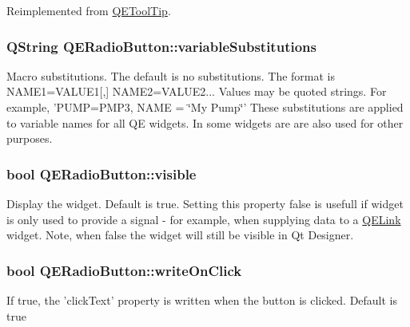 Reimplemented from \hyperlink{classQEToolTip}{QEToolTip}.

\hypertarget{classQERadioButton_ab2ed7b39ab32d1a5067d1c8e9fad850b}{
\subsubsection[{variableSubstitutions}]{\setlength{\rightskip}{0pt plus 5cm}QString QERadioButton::variableSubstitutions}}
\label{classQERadioButton_ab2ed7b39ab32d1a5067d1c8e9fad850b}
Macro substitutions. The default is no substitutions. The format is NAME1=VALUE1\mbox{[},\mbox{]} NAME2=VALUE2... Values may be quoted strings. For example, 'PUMP=PMP3, NAME = \char`\"{}My Pump\char`\"{}' These substitutions are applied to variable names for all QE widgets. In some widgets are are also used for other purposes. \hypertarget{classQERadioButton_a44e1fad82f677ad4f6060cdefb488b4c}{
\subsubsection[{visible}]{\setlength{\rightskip}{0pt plus 5cm}bool QERadioButton::visible}}
\label{classQERadioButton_a44e1fad82f677ad4f6060cdefb488b4c}
Display the widget. Default is true. Setting this property false is usefull if widget is only used to provide a signal -\/ for example, when supplying data to a \hyperlink{classQELink}{QELink} widget. Note, when false the widget will still be visible in Qt Designer. \hypertarget{classQERadioButton_afb7aded1c494314dda17c699ad8cfecb}{
\subsubsection[{writeOnClick}]{\setlength{\rightskip}{0pt plus 5cm}bool QERadioButton::writeOnClick}}
\label{classQERadioButton_afb7aded1c494314dda17c699ad8cfecb}
If true, the 'clickText' property is written when the button is clicked. Default is true 


